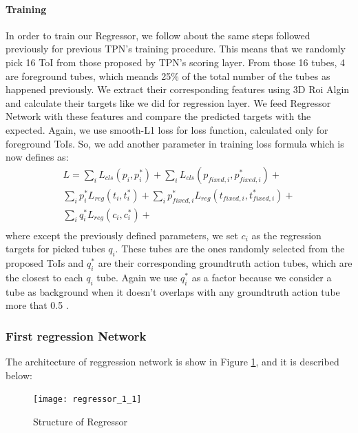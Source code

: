\paragraph{ Training}
In order to train our Regressor, we follow about the same steps followed previously for previous TPN's training procedure. This means that
we randomly pick 16 ToI from those proposed by TPN's scoring layer. From those 16 tubes, 4 are foreground tubes, which meands 25\% of the total
number of the tubes as happened previously. We extract their corresponding features using 3D Roi Algin and calculate their targets like
we did for regression layer. We feed Regressor Network with these features and compare the predicted targets with the expected.
Again, we use smooth-L1 loss for loss function, calculated only for foreground ToIs. So, we add another parameter in
training loss formula which is now defines as:
\begin{equation} 
\begin{split}
 L  =  \sum_iL_{cls}(p_i, p_i^*) + \sum_iL_{cls}(p_{fixed,i}, p_{fixed,i}^*) + \\
 \sum_ip_i^*L_{reg}(t_i,t_i^*) + \sum_ip_{fixed,i}^*L_{reg}(t_{fixed,i},t_{fixed,i}^*) + \\
  \sum_iq_i^*L_{reg}(c_{i}, c_{i}^*) + \\
\end{split}
\end{equation}
where  except the previously defined parameters, we set  $c_{i} $ as the regression targets for picked tubes $q_i$.
These tubes are the ones randomly selected from the proposed ToIs and $q_i^*$ are their corresponding groundtruth action tubes, which are the closest to each $q_i$ tube.
Again we use $q_i^*$ as a factor because we consider a tube as background when it doesn't overlaps with any groundtruth action tube more that 0.5 .

\subsubsection{First regression Network} 

The architecture of reggression network is show in Figure \ref{fig:regressor_3d}, and it is described below:
\begin{figure}[h]
  \centering
  \texttt{[image: regressor\_1\_1]}
  \caption{Structure of Regressor}
  \label{fig:regressor_3d}
\end{figure}

